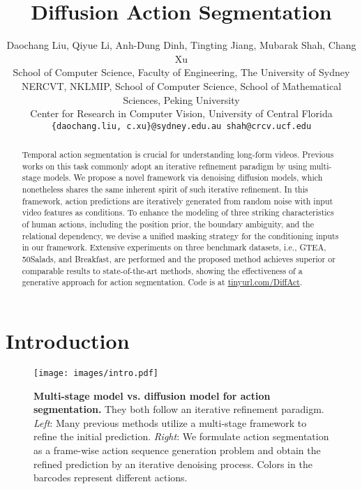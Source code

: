 \documentclass[10pt,twocolumn,letterpaper]{article}
\begin{document}
\title{Diffusion Action Segmentation}

\author{
    Daochang Liu, 
    Qiyue Li, 
    Anh-Dung Dinh, 
    Tingting Jiang, 
    Mubarak Shah, 
    Chang Xu
    \vspace{3pt}\\
    School of Computer Science, Faculty of Engineering, The University of Sydney\\
    NERCVT, NKLMIP, School of Computer Science, School of Mathematical Sciences, Peking University\\
    Center for Research in Computer Vision, University of Central Florida\\
    {\tt\small \{daochang.liu, c.xu\}@sydney.edu.au \quad shah@crcv.ucf.edu} \\
}

\maketitle
\ificcvfinal\thispagestyle{empty}\fi


\begin{abstract}
Temporal action segmentation is crucial for understanding long-form videos.
Previous works on this task commonly adopt an iterative refinement paradigm by using multi-stage models. 
We propose a novel framework via denoising diffusion models, which nonetheless shares the same inherent spirit of such iterative refinement.
In this framework, action predictions are iteratively generated from random noise with input video features as conditions.
To enhance the modeling of three striking characteristics of human actions, including the position prior, the boundary ambiguity, and the relational dependency, we devise a unified masking strategy for the conditioning inputs in our framework.
Extensive experiments on three benchmark datasets, i.e., GTEA, 50Salads, and Breakfast, are performed and the proposed method achieves superior or comparable results to state-of-the-art methods, showing the effectiveness of a generative approach for action segmentation.
Code is at \href{https://tinyurl.com/DiffAct}{tinyurl.com/DiffAct}.
\end{abstract}


\section{Introduction}

\begin{figure}[t]
\begin{center}
   \texttt{[image: images/intro.pdf]}
\end{center}
   \caption{\textbf{Multi-stage model vs. diffusion model for action segmentation.} They both follow an iterative refinement paradigm. \textit{Left}: Many previous methods utilize a multi-stage framework to refine the initial prediction. \textit{Right}: We formulate action segmentation as a frame-wise action sequence generation problem and obtain the refined prediction by an iterative denoising process. Colors in the barcodes represent different actions.}
\label{fig:intro}
\vspace{-0.5cm}
\end{figure}
\end{document}

